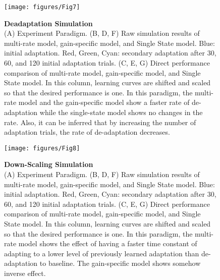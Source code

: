 \documentclass[9pt,twocolumn]{paper-template}
\begin{document}
\begin{figure}[h!]
  \centering
     \texttt{[image: figures/Fig7]}
  \caption{\textbf{Deadaptation Simulation}\\ (A)  Experiment Paradigm. (B, D, F) Raw simulation results of multi-rate model, gain-specific model, and Single State model. Blue: initial adaptation. Red, Green, Cyan: secondary adaptation after 30, 60, and 120 initial adaptation trials. (C, E, G) Direct performance comparison of multi-rate model, gain-specific model, and Single State model. In this column, learning curves are shifted and scaled so that the desired performance is one. In this paradigm, the multi-rate model and the gain-specific model show a faster rate of de-adaptation while the single-state model shows no changes in the rate. Also, it can be inferred that by increasing the number of adaptation trials, the rate of de-adaptation decreases. 
}
  \label{fig:Deadaptation_Simulation}
\end{figure}


\begin{figure}[h!]
  \centering
     \texttt{[image: figures/Fig8]}
  \caption{\textbf{Down-Scaling Simulation}\\ (A)  Experiment Paradigm. (B, D, F) Raw simulation results of multi-rate model, gain-specific model, and Single State model. Blue: initial adaptation. Red, Green, Cyan: secondary adaptation after 30, 60, and 120 initial adaptation trials. (C, E, G) Direct performance comparison of multi-rate model, gain-specific model, and Single State model. In this column, learning curves are shifted and scaled so that the desired performance is one. In this paradigm, the multi-rate model shows the effect of having a faster time constant of adapting to a lower level of previously learned adaptation than de-adaptation to baseline. The gain-specific model shows somehow inverse effect.
}
  \label{fig:Down_Scaling_Simulation}
\end{figure}
\end{document}

